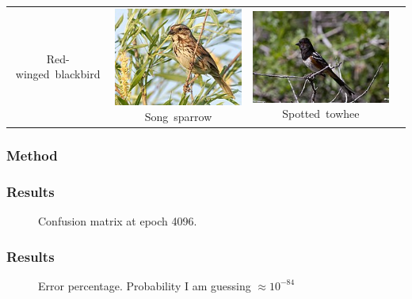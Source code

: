 \documentclass{beamer}
\begin{document}
\begin{frame}
{\begin{tabular}{cccc}
{            \hbox{\tiny Red-winged blackbird}}
        &
        \vbox{%
            \hbox{\includegraphics[width=\picwidth]{images/sonspa.jpg}}
            \hbox{\tiny Song sparrow}}
        & 
        \vbox{%
            \hbox{\includegraphics[width=\picwidth]{images/spotow.jpg}}
            \hbox{\tiny Spotted towhee}}\\
    \end{tabular}}
\end{frame}

\begin{frame}
    \frametitle{Method}
        \vfill
\end{frame}

\begin{frame}
    \frametitle{Results}
    \begin{figure}
        \caption{Confusion matrix at epoch 4096.}
    \end{figure}
\end{frame}
\begin{frame}
    \frametitle{Results}
    \begin{figure}
        \caption{Error percentage. Probability I am guessing $\approx 10^{-84}$}
    \end{figure}
\end{frame}
\end{document}
